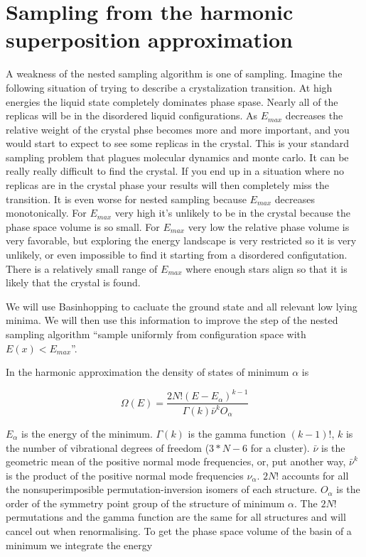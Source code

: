 \documentclass[a4paper]{article}
\begin{document}
\section{Sampling from the harmonic superposition approximation}

A weakness of the nested sampling algorithm is one of sampling.  Imagine the following situation
of trying to describe a crystalization transition.  At high energies the liquid state
completely dominates phase spase.  Nearly all of the replicas will be in the disordered liquid
configurations.  As $E_{max}$ decreases the relative weight of the crystal phse becomes more 
and more important, and you would start to expect to see some replicas in the crystal.  This is
your standard sampling problem that plagues molecular dynamics and monte carlo.
It can be really really difficult to find the crystal.  If you end up in a
situation where no replicas are in the crystal phase your results will then
completely miss the transition.  It is even worse for nested sampling because $E_{max}$ decreases
monotonically. For $E_{max}$ very high it's unlikely to be in the crystal because the phase space 
volume is so small.  For $E_{max}$ very low the relative phase volume is very
favorable, but exploring the energy landscape is very restricted so it is very
unlikely, or even impossible to find it starting from a disordered
configutation.  There is a relatively small range of $E_{max}$ where enough stars align so that
it is likely that the crystal is found.

We will use Basinhopping to cacluate the ground state and all relevant low lying minima.
We will then use this information to improve the step of the nested sampling
algorithm ``sample uniformly from configuration space with $E(x) < E_{max}$''.

In the harmonic approximation the density of states of minimum $\alpha$ is

\begin{equation}
  \Omega(E) = \frac{2N!(E - E_\alpha)^{k-1} }{\Gamma(k) \bar{\nu}^k O_\alpha}
\end{equation}

$E_\alpha$ is the energy of the minimum.  $\Gamma(k)$ is the gamma function $(k-1)!$, $k$ is the number
of vibrational degrees of freedom ($3*N-6$ for a cluster).  $\bar{\nu}$ is the geometric mean of the positive normal mode frequencies, or, put another way, $\bar{\nu}^k$ is the product of the positive normal mode frequencies $\nu_{\alpha}$.  $2N!$ accounts for all the nonsuperimposible permutation-inversion isomers of each structure. $O_\alpha$ is the order of the symmetry point group of the structure of minimum $\alpha$.  The $2N!$ permutations and the gamma function are the same for all structures and will cancel out when renormalising.
To get the phase space volume of the basin of a minimum we integrate the energy
\end{document}
